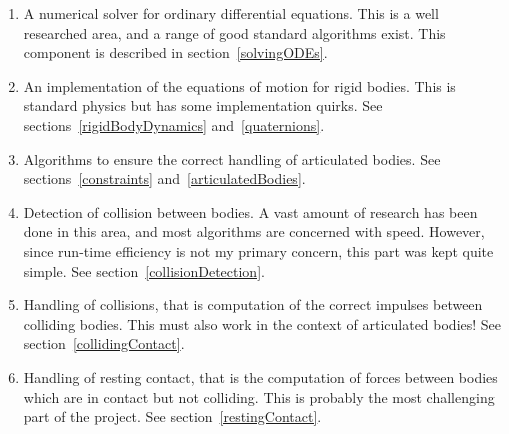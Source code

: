 \begin{enumerate}
\item A numerical solver for ordinary differential equations. This is a well researched area, and
    a range of good standard algorithms exist. This component is described in
    section~\ref{solvingODEs}.
\item An implementation of the equations of motion for rigid bodies. This is standard physics but
    has some implementation quirks. See sections~\ref{rigidBodyDynamics} and~\ref{quaternions}.
\item Algorithms to ensure the correct handling of articulated bodies.
    See sections~\ref{constraints} and~\ref{articulatedBodies}.
\item Detection of collision between bodies. A vast amount of research has been done in this area,
    and most algorithms are concerned with speed. However, since run-time efficiency is not my
    primary concern, this part was kept quite simple. See section~\ref{collisionDetection}.
\item Handling of collisions, that is computation of the correct impulses between colliding
    bodies. This must also work in the context of articulated bodies!
    See section~\ref{collidingContact}.
\item Handling of resting contact, that is the computation of forces between bodies which are in
    contact but not colliding. This is probably the most challenging part of the project.
    See section~\ref{restingContact}.
\end{enumerate}
